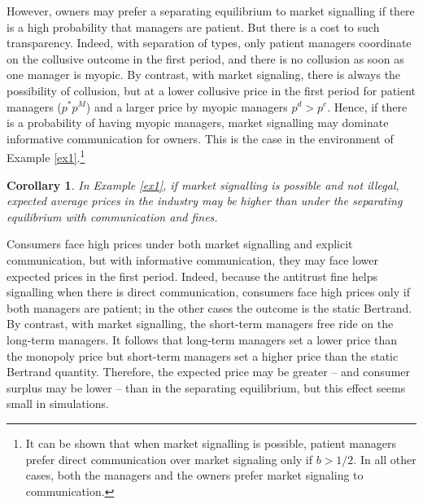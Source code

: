 \documentclass[]{article}
\newtheorem{corollary}{Corollary}
\begin{document}
However, owners may prefer a separating equilibrium to market signalling if there is a high probability that managers are patient. But there is a cost to such transparency. Indeed, with separation of types, only patient managers coordinate on the collusive outcome in the first period, and there is no collusion as soon as one manager is myopic. By contrast, with market signaling, there is always the possibility of collusion, but at a lower collusive price in the first period for patient managers ($p^*  p^M$) and a larger price by myopic managers $p^d>p^c$. Hence, if there is a probability of having myopic managers, market signalling may dominate informative communication for owners. This is the case in the environment of Example \ref{ex1}.\footnote{%
It can be shown that when market signalling is possible, patient managers prefer direct communication over market signaling only if $b>1/2$. In all other cases, both the managers and the owners prefer market signaling to communication.}

\begin{corollary}
In Example \ref{ex1}, if market signalling is possible and not illegal, expected average prices in the industry may be higher than under the separating equilibrium with communication and fines.
\end{corollary}
%
Consumers face high prices under both market signalling and explicit communication, but with informative communication, they may face lower expected prices in the first period. Indeed, because the antitrust fine helps signalling when there is direct communication, consumers face high prices only if both managers are patient; in the other cases the outcome is the static Bertrand. By contrast, with market signalling, the short-term managers free ride on the long-term managers. It follows that long-term managers set a lower price than the monopoly price but short-term managers set a higher price than the static Bertrand quantity. Therefore, the expected price may be greater -- and consumer surplus may be lower -- than in the separating equilibrium, but this effect seems small in simulations. 
\end{document}
